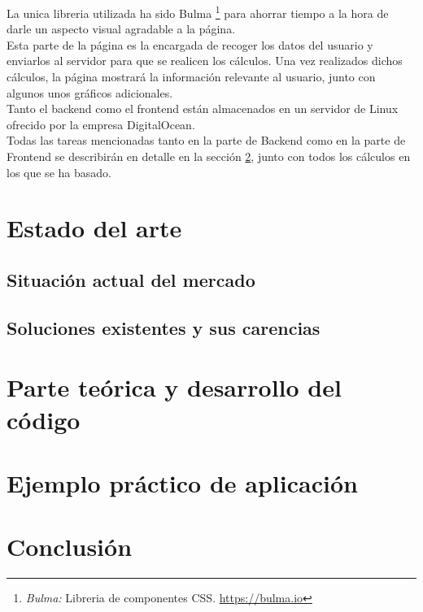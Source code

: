 \documentclass[11pt]{article}
\begin{document}
La unica libreria utilizada ha sido Bulma \footnote{\textit{Bulma:} Libreria de componentes CSS. \url{https://bulma.io}} para ahorrar tiempo a la hora de darle un aspecto visual agradable a la página.\\

Esta parte de la página es la encargada de recoger los datos del usuario  y enviarlos al servidor para que se realicen los cálculos. Una vez realizados dichos cálculos, la página mostrará la información relevante al usuario, junto con algunos unos gráficos adicionales.\\

Tanto el backend como el frontend están almacenados en un servidor de Linux ofrecido por la empresa DigitalOcean.\\

Todas las tareas mencionadas tanto en la parte de Backend como en la parte de Frontend se describirán en detalle en la sección \ref{sec:theory}, junto con todos los cálculos en los que se ha basado. 

\newpage

\section{Estado del arte}



\subsection{Situación actual del mercado}

\subsection{Soluciones existentes y sus carencias}


\section{Parte teórica y desarrollo del código}
\label{sec:theory}

\section{Ejemplo práctico de aplicación}

\section{Conclusión}


\pagebreak

\begin{thebibliography}{99}
 
\end{thebibliography}
\end{document}
